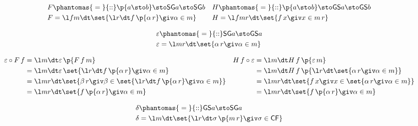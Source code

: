 \documentclass{article}
\newcommand{\SG}[1]{\textsf{SG}#1}
\newcommand{\GS}[1]{\textsf{GS}#1}
\newcommand{\type}{\phantomas{{}={}}{::}}
\begin{document}
\begin{align*}
F &\type \p{a\sto b} \sto \SG{a} \sto \SG{b}
&
H &\type \p{a\sto b} \sto \GS{a} \sto \GS{b}
%
\\
%
F &= \l fm\dt \set{\l r\dt f\,\p{\alpha\,r} \giv \alpha \in m}
&
H &= \l fmr\dt \set{f\,x \giv x\in m\,r}
\end{align*}

\dotfill

\begin{align*}
\varepsilon &\type \SG{a} \sto \GS{a}\\
\varepsilon &= \l mr\dt \set{\alpha\,r \giv \alpha\in m}
\end{align*}

\begin{center}
\end{center}

\begin{align*}
\varepsilon \circ F\,f
&=
\l m\dt \varepsilon\,\p{F\,f\,m}
&
H\,f \circ \varepsilon
&=
\l m\dt H\,f\,\p{\varepsilon\,m}
%
\\
%
&= \l m\dt \varepsilon\,\set{\l r\dt f\,\p{\alpha\,r} \giv \alpha\in m}
&
&= \l m\dt H\,f\,\p{\l r\dt \set{\alpha\,r \giv \alpha\in m}}
%
\\
%
&= \l mr\dt \set{\beta\,r \giv \beta\in \set{\l r\dt f\,\p{\alpha\,r} \giv \alpha\in m}}
&
&= \l mr\dt \set{f\,x \giv x \in \set{\alpha\,r \giv \alpha\in m}}
%
\\
%
&= \l mr\dt \set{f\,\p{\alpha\,r} \giv \alpha\in m}
&
&= \l mr\dt \set{f\,\p{\alpha\,r} \giv \alpha\in m}
\end{align*}

\dotfill

\begin{align*}
\delta &\type \GS{a} \sto \SG{a}\\
\delta &= \l m\dt \set{\l r\dt \sigma\,\p{m\,r} \giv \sigma\in\textsf{CF}}
\end{align*}

\begin{center}
\end{center}
\end{document}
